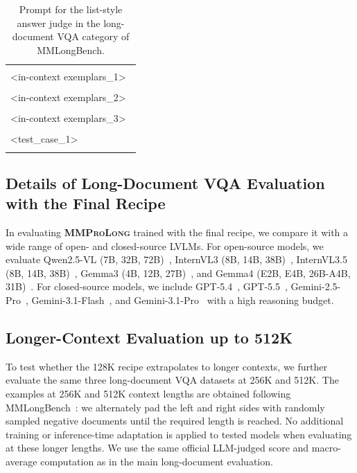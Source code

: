 \documentclass{llmxive}
\providecommand{\modelname}{\textsc{\textbf{MMProLong}}\xspace}
\providecommand{\promptplaceholder}[1]{\colorbox{gray!12}{\ttfamily #1}}
\begin{document}
{{{\begin{table}[!htbp]
\begin{tabular}{p{0.96\linewidth}}
\begin{minipage}{0.96\linewidth}
 \quad \\
 \promptplaceholder{<in-context exemplars\_1>} \\
 \quad \\
 \promptplaceholder{<in-context exemplars\_2>} \\
 \quad \\
 \promptplaceholder{<in-context exemplars\_3>} \\
 \quad \\
 \promptplaceholder{<test\_case\_1>} \\
 \end{minipage} \\
 \bottomrule
 \end{tabular}
\caption{Prompt for the list-style answer judge in the long-document VQA category of MMLongBench.}
\label{tab:list_judge_prompt}
\end{table}

\subsection{Details of Long-Document VQA Evaluation with the Final Recipe}
\label{app:evaluation_details:final_recipe}
In evaluating \modelname trained with the final recipe, we compare it with a wide range of open- and closed-source LVLMs.
For open-source models, we evaluate Qwen2.5-VL (7B, 32B, 72B)~\citep{bai2025qwen2}, InternVL3 (8B, 14B, 38B)~\citep{zhu2025internvl3}, InternVL3.5 (8B, 14B, 38B)~\citep{wang2025internvl35}, Gemma3 (4B, 12B, 27B)~\citep{team2025gemma3}, and Gemma4 (E2B, E4B, 26B-A4B, 31B)~\citep{google2026gemma4}.
For closed-source models, we include GPT-5.4~\citep{openai2026introducing_gpt5_4}, GPT-5.5~\citep{openai2026introducing_gpt5_5}, Gemini-2.5-Pro~\citep{google2025gemini2_5}, Gemini-3.1-Flash~\citep{gemini_3_1_pro_2026}, and Gemini-3.1-Pro~\citep{gemini_3_1_pro_2026} with a high reasoning budget.

\subsection{Longer-Context Evaluation up to 512K}
\label{app:evaluation_details:longer_context}
To test whether the 128K recipe extrapolates to longer contexts, we further evaluate the same three long-document VQA datasets at 256K and 512K.
The examples at 256K and 512K context lengths are obtained following MMLongBench~\citep{wang2025mmlongbench}: we alternately pad the left and right sides with randomly sampled negative documents until the required length is reached.
No additional training or inference-time adaptation is applied to tested models when evaluating at these longer lengths.
We use the same official LLM-judged score and macro-average computation as in the main long-document evaluation.

}}}
\end{document}
